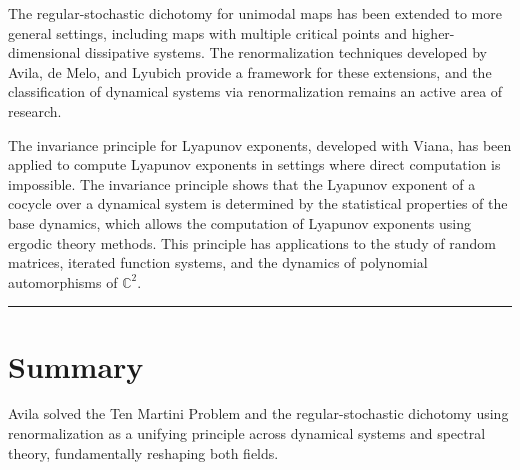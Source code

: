 The regular-stochastic dichotomy for unimodal maps has been extended to more general settings, including maps with multiple critical points and higher-dimensional dissipative systems. The renormalization techniques developed by Avila, de Melo, and Lyubich provide a framework for these extensions, and the classification of dynamical systems via renormalization remains an active area of research.

The invariance principle for Lyapunov exponents, developed with Viana, has been applied to compute Lyapunov exponents in settings where direct computation is impossible. The invariance principle shows that the Lyapunov exponent of a cocycle over a dynamical system is determined by the statistical properties of the base dynamics, which allows the computation of Lyapunov exponents using ergodic theory methods. This principle has applications to the study of random matrices, iterated function systems, and the dynamics of polynomial automorphisms of $\mathbb{C}^2$.

\begin{center}\rule{0.5\linewidth}{0.5pt}\end{center}

\section*{Summary}

Avila solved the Ten Martini Problem and the regular-stochastic dichotomy using renormalization as a unifying principle across dynamical systems and spectral theory, fundamentally reshaping both fields.
